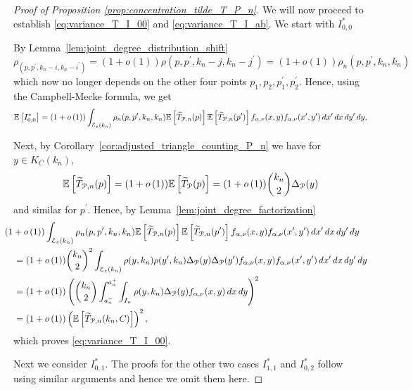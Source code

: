 \begin{proof}[Proof of Proposition \ref{prop:concentration_tilde_T_P_n}]
We will now proceed to establish \eqref{eq:variance_T_I_00} and \eqref{eq:variance_T_I_ab}. We start with $I_{0,0}^\ast$ 


By Lemma~\ref{lem:joint_degree_distribution_shift} 
\[
	\rho_(p,p^\prime, k_n-i,k_n-i^\prime) = (1+o(1))\rho(p,p^\prime, k_n-j,k_n-j^\prime) 
	= (1+o(1))\rho_{n}(p, p^\prime, k_n, k_n)
\]
which now no longer depends on the other four points $p_1, p_2, p_1^\prime, p_2^\prime$. Hence, using the Campbell-Mecke formula, we get
\[
	\mathbb{E}\left[I_{0,0}^\ast\right] = (1 + o\left(1\right))\int_{\mathcal{E}_{\varepsilon}(k_n)}\rho_{n}(p,p^\prime,k_n, k_n)
		\mathbb{E}\left[\widetilde{T}_{{\mathcal P},n}(p)\right]\mathbb{E}\left[\widetilde{T}_{{\mathcal P},n}(p^\prime)\right] f_{\alpha,\nu}(x,y)
		f_{\alpha,\nu}(x^\prime,y^\prime) \, dx^\prime \, dx \, dy^\prime \, dy,
\]

Next, by Corollary~\ref{cor:adjusted_triangle_counting_P_n} we have for $y \in K_C(k_n)$,
\[
	\mathbb{E}\left[\widetilde{T}_{{\mathcal P},n}(p)\right] = (1+o\left(1\right))\mathbb{E}\left[\widetilde{T}_{{\mathcal P}}(p)\right] = (1 + o\left(1\right)) \binom{k_n}{2} \Delta_{{\mathcal P}}(y)
\] 
and similar for $p^\prime$. Hence, by Lemma~\ref{lem:joint_degree_factorization} 
\begin{align*}
	&\hspace{-10pt}(1 + \smallO{1})\int_{\mathcal{E}_\varepsilon(k_n)} \rho_n(p, p^\prime, k_n, k_n)
		\Exp{\widetilde{T}_{\Pcal,n}(p)}\Exp{\widetilde{T}_{\Pcal,n}(p^\prime)} f_{\alpha,\nu}(x,y)
		f_{\alpha,\nu}(x^\prime,y^\prime) \, dx^\prime \, dx \, dy^\prime \, dy\\
	&= (1+\smallO{1})\binom{k_n}{2}^2 \int_{\mathcal{E}_\varepsilon(k_n)} 
		\rho(y, k_n) \rho(y^\prime, k_n) \Delta_{\Pcal}(y) \Delta_\Pcal(y^\prime) 	f_{\alpha,\nu}(x,y) 
		f_{\alpha,\nu}(x^\prime,y^\prime) \, dx^\prime \, dx \, dy^\prime \, dy\\
	&= (1+\smallO{1}) \left( \binom{k_n}{2} \int_{a_n^-}^{a_n^+}\int_{I_n} \rho(y,k_n)
		\Delta_{\Pcal}(y) f_{\alpha,\nu}(x,y) \, dx \, dy\right)^2\\
	&= (1 + \smallO{1})\left(\Exp{\widetilde{T}_{\Pcal,n}(k_n,C)}\right)^2,
\end{align*}
which proves \eqref{eq:variance_T_I_00}.

Next we consider $I_{0,1}^\ast$. The proofs for the other two cases $I_{1,1}^\ast$ and $I_{0,2}^\ast$ follow using similar arguments and hence we omit them here.


\end{proof}
